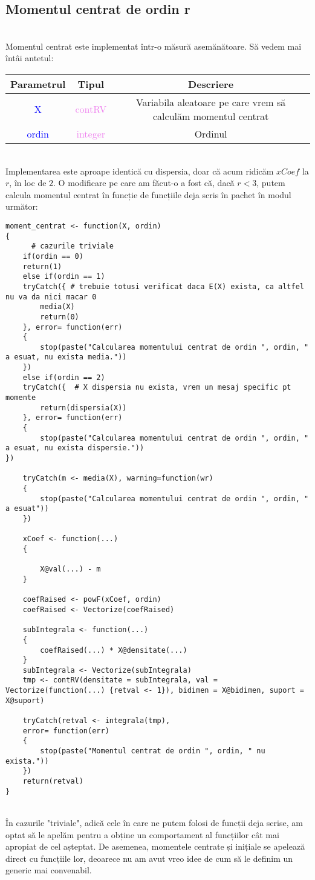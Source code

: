 \documentclass[12pt]{article}
\begin{document}
\subsection{Momentul centrat de ordin r}\hfill \\
\indent Momentul centrat este implementat într-o măsură asemănătoare. Să vedem mai întâi antetul:
\begin{center}
	\begin{tabular}{|| c | c | c ||}
		\hline
		Parametrul & Tipul & Descriere \\
		\hline
		\textcolor{blue}{X} & \textcolor{violet}{contRV} & Variabila aleatoare pe care vrem să calculăm momentul centrat\\
		\hline
		\textcolor{blue}{ordin} & \textcolor{violet}{integer} & Ordinul\\
		\hline
	\end{tabular}
\end{center}\hfill \\
\indent Implementarea este aproape identică cu dispersia, doar că acum ridicăm $xCoef$ la $r$, în loc de $2$. O modificare pe care am făcut-o a fost că, dacă $r < 3$, putem calcula momentul centrat în funcție de funcțiile deja scris în pachet în modul următor:
\begin{lstlisting}
moment_centrat <- function(X, ordin)
{
	  # cazurile triviale
	if(ordin == 0)
	return(1)
	else if(ordin == 1)
	tryCatch({ # trebuie totusi verificat daca E(X) exista, ca altfel nu va da nici macar 0
		media(X)
		return(0)
	}, error= function(err)
	{
		stop(paste("Calcularea momentului centrat de ordin ", ordin, " a esuat, nu exista media."))
	})
	else if(ordin == 2)
	tryCatch({  # X dispersia nu exista, vrem un mesaj specific pt momente
		return(dispersia(X))
	}, error= function(err)
	{
		stop(paste("Calcularea momentului centrat de ordin ", ordin, " a esuat, nu exista dispersie."))
})
	
	tryCatch(m <- media(X), warning=function(wr)
	{
		stop(paste("Calcularea momentului centrat de ordin ", ordin, " a esuat"))
	})
	
	xCoef <- function(...)
	{
		
		X@val(...) - m
	}
	
	coefRaised <- powF(xCoef, ordin)
	coefRaised <- Vectorize(coefRaised)
	
	subIntegrala <- function(...)
	{
		coefRaised(...) * X@densitate(...)
	}
	subIntegrala <- Vectorize(subIntegrala)
	tmp <- contRV(densitate = subIntegrala, val = Vectorize(function(...) {retval <- 1}), bidimen = X@bidimen, suport = X@suport)
	
	tryCatch(retval <- integrala(tmp),
	error= function(err)
	{
		stop(paste("Momentul centrat de ordin ", ordin, " nu exista."))
	})
	return(retval)
}
\end{lstlisting} \hfill \\
\indent În cazurile "triviale", adică cele în care ne putem folosi de funcții deja scrise, am optat să le apelăm pentru a obține un comportament al funcțiilor cât mai apropiat de cel așteptat. De asemenea, momentele centrate și inițiale se apelează direct cu funcțiile lor, deoarece nu am avut vreo idee de cum să le definim un generic mai convenabil. \\
\end{document}
